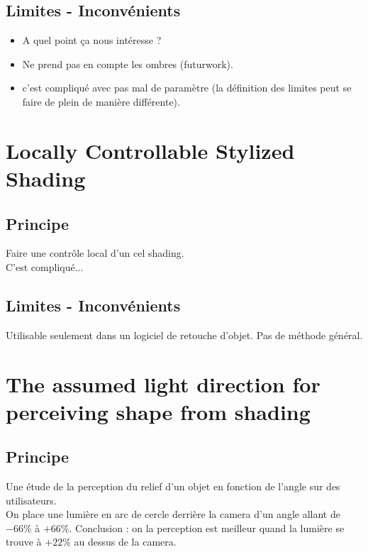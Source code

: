 \documentclass[a4paper]{article}
\begin{document}
\subsection{Limites - Inconvénients}
\begin{itemize}
\item A quel point ça nous intéresse ?  
\item Ne prend pas en compte les ombres (futurwork). 
\item c'est compliqué avec pas mal de paramètre (la définition des limites peut se faire de plein de manière différente).
\end{itemize}

\section{Locally Controllable Stylized Shading}
\subsection{Principe}
Faire une contrôle local d'un cel shading.\\ 
C'est compliqué...

\subsection{Limites - Inconvénients}
Utilisable seulement dans un logiciel de retouche d'objet. Pas de méthode général. 



\section{The assumed light direction for perceiving shape from shading}
\subsection{Principe}
Une étude de la perception du relief d'un objet en fonction de l'angle sur des utilisateurs.\\
On place une lumière en arc de cercle derrière la camera d'un angle allant de $-66\%$ à $+66\%$.
Conclusion : on la perception est meilleur quand la lumière se trouve à $+22\%$ au dessus de la camera.  
\end{document}
